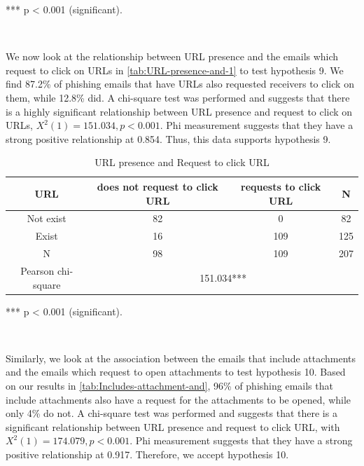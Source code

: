 {*}{*}{*} p < 0.001 (significant).

\ 

We now look at the relationship between URL presence and the emails
which request to click on URLs in \autoref{tab:URL-presence-and-1}
to test hypothesis 9. We find 87.2\% of phishing emails that have
URLs also requested receivers to click on them, while 12.8\% did.
A chi-square test was performed and suggests that there is a highly
significant relationship between URL presence and request to click
on URLs, $X^{2}(1)=151.034,p<0.001$. Phi measurement suggests that
they have a strong positive relationship at 0.854. Thus, this data
supports hypothesis 9.

\begin{minipage}[t]{1\columnwidth}%
\begin{longtable}{cccc}
\caption{\label{tab:URL-presence-and-1}URL presence and Request to click URL}
\tabularnewline
\toprule 
{\footnotesize{}URL} & {\footnotesize{}does not request to click URL} & {\footnotesize{}requests to click URL} & \multirow{1}{*}{{\footnotesize{}N}}\tabularnewline
\midrule 
\multirow{1}{*}{{\footnotesize{}Not exist}} & {\footnotesize{}82} & {\footnotesize{}0} & \multirow{1}{*}{{\footnotesize{}82}}\tabularnewline
\midrule 
\multirow{1}{*}{{\footnotesize{}Exist}} & {\footnotesize{}16} & {\footnotesize{}109} & \multirow{1}{*}{{\footnotesize{}125}}\tabularnewline
\midrule
\midrule 
{\footnotesize{}N} & {\footnotesize{}98} & {\footnotesize{}109} & {\footnotesize{}207}\tabularnewline
\midrule
\midrule 
{\footnotesize{}Pearson chi-square} & \multicolumn{3}{c}{{\footnotesize{}151.034{*}{*}{*}}}\tabularnewline
\midrule
\end{longtable}%
\end{minipage}

{*}{*}{*} p < 0.001 (significant).

\ 

Similarly, we look at the association between the emails that include
attachments and the emails which request to open attachments to test
hypothesis 10. Based on our results in \autoref{tab:Includes-attachment-and},
96\% of phishing emails that include attachments also have a request
for the attachments to be opened, while only 4\% do not. A chi-square
test was performed and suggests that there is a significant relationship
between URL presence and request to click URL, with $X^{2}(1)=174.079,p<0.001$.
Phi measurement suggests that they have a strong positive relationship
at 0.917. Therefore, we accept hypothesis 10.

